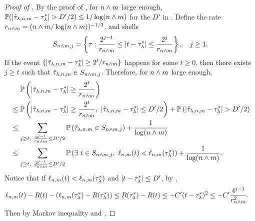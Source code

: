 \begin{proof}[Proof of ]
By the proof of , for ${n} \wedge m$ large enough,  $\mathbb{P}(|{\hat{\tau}_{\lambda, {n}, m}} - {\tau^*_\lambda}| > D'/2) \le 1/\log({n} \wedge m)$ for the $D'$ in .
Define the rate
$r_{{n} \wedge m} = ({{n} \wedge m}/\log({{n} \wedge m}))^{-1/3}$, and shells
\begin{align*}
 S_{{{n} \wedge m},j} = \left\{\tau: \frac{2^{j-1}}{r_{{n} \wedge m}} \le  |{t} - {\tau^*_\lambda}| \le \frac{2^j}{r_{{n} \wedge m}} \right\}, \quad j \ge 1.
\end{align*}
If the event $\{|{\hat{\tau}_{\lambda, {n}, m}}- {\tau^*_\lambda}| \ge 2^t/r_{{n} \wedge m}\}$ happens for some $t \ge 0$, then there exists $j \ge t$ such that ${\hat{\tau}_{\lambda, {n}, m}} \in S_{{{n} \wedge m}, j}$. Therefore, for ${n} \wedge m$ large enough,
\begin{align*}
    &\quad~\mathbb{P}\left(
    |{\hat{\tau}_{\lambda, {n}, m}}- {\tau^*_\lambda}| \ge \frac{2^t}{r_{{n} \wedge m}}
    \right)\\
    &\le \mathbb{P}\left(
    |{\hat{\tau}_{\lambda, {n}, m}} - {\tau^*_\lambda}| \ge \frac{2^t}{r_{{n} \wedge m}},  ~|{\hat{\tau}_{\lambda, {n}, m}} - {\tau^*_\lambda}|\le D'/2
    \right) + \mathbb{P}\left(
    |{\hat{\tau}_{\lambda, {n}, m}}- {\tau^*_\lambda}| > D'/2
    \right) \\
    &\le \sum_{j \ge t, ~\frac{2^{j-1}}{r_{{n} \wedge m}} \le D'/2} \mathbb{P}\left(
    {\hat{\tau}_{\lambda, {n}, m}} \in S_{{n} \wedge m,j}
    \right)  + \frac{1}{\log({n} \wedge m)} \\
    &\le \sum_{j \ge t, ~\frac{2^{j-1}}{r_{{n} \wedge m}} \le D'/2} \mathbb{P}\left(
    \exists~{t} \in  S_{{n} \wedge m,j},~ {{\ell}_{{n}, m}}({t}) < {{\ell}_{{n}, m}}({\tau^*_\lambda})
    \right)  + \frac{1}{\log({n} \wedge m)}.
\end{align*}
Notice that if ${{\ell}_{{n}, m}}({t}) < {{\ell}_{{n}, m}}({\tau^*_\lambda})$
and $|{t} - {\tau^*_\lambda}| \le D'$, by ,
\begin{align*}
    {{\ell}_{{n}, m}}({t}) - {R}({t}) - ({{\ell}_{{n}, m}}({\tau^*_\lambda}) - {R}({\tau^*_\lambda}))
    &\le {R}({\tau^*_\lambda}) - {R}({t})
    \le -C'({t} - {\tau^*_\lambda})^2
    \le  -C'\frac{4^{j-1}}{r_{{n} \wedge m}^2}.
\end{align*}
Then by Markov inequality and ,

\end{proof}
